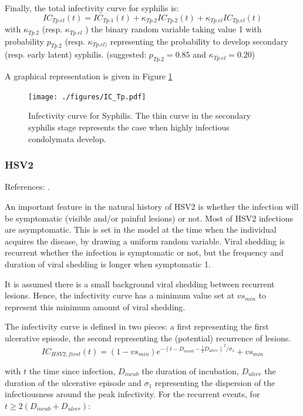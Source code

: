 \documentclass[11pt, onecolumn]{article}
\begin{document}
Finally, the total infectivity curve for syphilis is:
$$IC_{Tp.el}(t) = IC_{Tp.1}(t) +\kappa_{Tp.2}IC_{Tp.2}(t) +\kappa_{Tp.el}IC_{Tp.el}(t) $$
with $\kappa_{Tp.2}$ (resp. $\kappa_{Tp.el}$ ) the binary random variable taking value 1 with probability $p_{Tp.2}$ (resp. $\kappa_{Tp.el)}$ representing the probability to develop secondary (resp. early latent) syphilis. (suggested: $p_{Tp.2}=0.85$ and $\kappa_{Tp.el}=0.20$)

A graphical representation is given in Figure \ref{fig:ICTp}

\begin{figure}[!ht]
\centering
    \texttt{[image: ./figures/IC\_Tp.pdf]}
\caption{Infectivity curve for Syphilis. The thin curve in the secondary syphilis stage represents the case when highly infectious condolymata develop.}
\label{fig:ICTp}
\end{figure} 



\subsubsection{HSV2}

References: \cite{Tronstein:2011vs,Schiffer:2014cc}.

An important feature in the natural history of HSV2 is whether the infection will be symptomatic (visible and/or painful lesions) or not.
Most of HSV2 infections are asymptomatic. This is set in the model at the time when the individual acquires the disease, by drawing a uniform random variable. Viral shedding is recurrent whether the infection is symptomatic or not, but the frequency and duration of viral shedding is longer when symptomatic 1. 

It is assumed there is a small background viral shedding between recurrent lesions. Hence, the infectivity curve has a minimum value set at $vs_{min}$ to represent this minimum amount of viral shedding. 

The infectivity curve is defined in two pieces: a first representing the first ulcerative episode, the second representing the (potential) recurrence of lesions.
$$IC_{HSV2,first}(t) = (1-vs_{min})e^{-(t-D_{incub}-\frac{1}{2}D_{ulcer})^2 / \sigma_1}+vs_{min}$$

with $t$ the time since infection, $D_{incub}$ the duration of incubation, $D_{ulcer}$ the duration of the ulcerative episode and $\sigma_1$ representing the dispersion of the infectiousness around the peak infectivity.
For the recurrent events, for $t \geq 2(D_{incub}+D_{ulcer})$:
\end{document}
